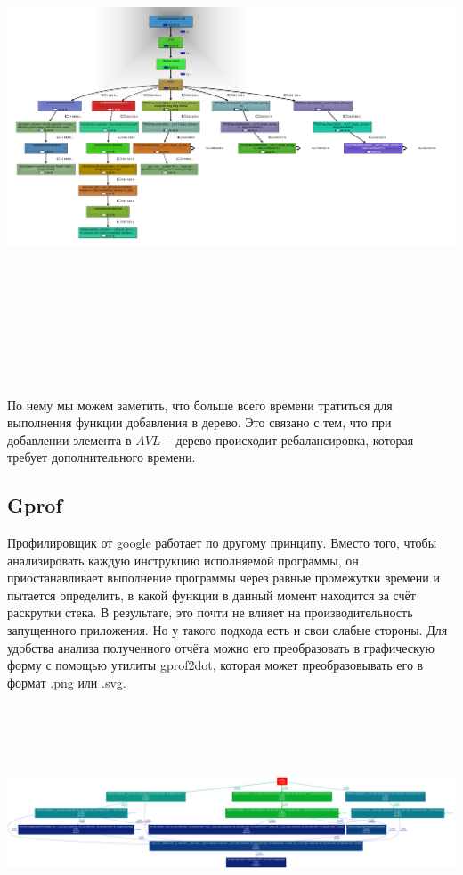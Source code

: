 \includegraphics[width=7.5in,height=150mm]{src/graph.png}

По нему мы можем заметить, что больше всего времени тратиться для выполнения функции добавления в дерево. Это связано с тем, что при добавлении элемента в $AVL-$дерево происходит ребалансировка, которая требует дополнительного времени.


\subsection{Gprof}
Профилировщик от google работает по другому принципу. Вместо того, чтобы анализировать каждую инструкцию исполняемой программы, он приостанавливает выполнение программы через равные промежутки времени и пытается определить, в какой функции в данный момент находится за счёт раскрутки стека. В результате, это почти не влияет на производительность запущенного приложения. Но у такого подхода есть и свои слабые стороны. Для удобства анализа полученного отчёта можно его преобразовать в графическую форму с помощью утилиты gprof2dot, которая может преобразовывать его в формат .png или .svg.

\includegraphics[width=7in,height=70mm]{src/output.png}

